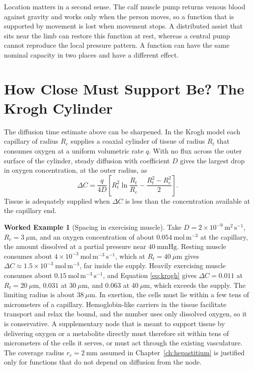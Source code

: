 \documentclass[11pt,openany]{book}
\theoremstyle{definition}
\newtheorem{example}{Worked Example}[chapter]
\theoremstyle{remark}
\begin{document}
Location matters in a second sense. The calf muscle pump returns venous blood against gravity and works only when the person moves, so a function that is supported by movement is lost when movement stops. A distributed assist that sits near the limb can restore this function at rest, whereas a central pump cannot reproduce the local pressure pattern. A function can have the same nominal capacity in two places and have a different effect.

\section{How Close Must Support Be? The Krogh Cylinder}

The diffusion time estimate above can be sharpened. In the Krogh model each capillary of radius $R_c$ supplies a coaxial cylinder of tissue of radius $R_t$ that consumes oxygen at a uniform volumetric rate $q$. With no flux across the outer surface of the cylinder, steady diffusion with coefficient $D$ gives the largest drop in oxygen concentration, at the outer radius, as
\begin{equation}
\Delta C=\frac{q}{4D}\left[R_t^{2}\ln\frac{R_t}{R_c}-\frac{R_t^{2}-R_c^{2}}{2}\right].
\label{eq:krogh}
\end{equation}
Tissue is adequately supplied when $\Delta C$ is less than the concentration available at the capillary end.

\begin{example}[Spacing in exercising muscle]
\label{ex:krogh}
Take $D=2\times10^{-9}\ \mathrm{m^{2}\,s^{-1}}$, $R_c=3\ \mu\mathrm{m}$, and an oxygen concentration of about $0.054\ \mathrm{mol\,m^{-3}}$ at the capillary, the amount dissolved at a partial pressure near $40\ \mathrm{mmHg}$. Resting muscle consumes about $4\times10^{-3}\ \mathrm{mol\,m^{-3}\,s^{-1}}$, which at $R_t=40\ \mu\mathrm{m}$ gives $\Delta C\approx1.5\times10^{-3}\ \mathrm{mol\,m^{-3}}$, far inside the supply. Heavily exercising muscle consumes about $0.15\ \mathrm{mol\,m^{-3}\,s^{-1}}$, and Equation \eqref{eq:krogh} gives $\Delta C=0.011$ at $R_t=20\ \mu\mathrm{m}$, $0.031$ at $30\ \mu\mathrm{m}$, and $0.063$ at $40\ \mu\mathrm{m}$, which exceeds the supply. The limiting radius is about $38\ \mu\mathrm{m}$. In exertion, the cells must lie within a few tens of micrometers of a capillary. Hemoglobin-like carriers in the tissue facilitate transport and relax the bound, and the number uses only dissolved oxygen, so it is conservative. A supplementary node that is meant to support tissue by delivering oxygen or a metabolite directly must therefore sit within tens of micrometers of the cells it serves, or must act through the existing vasculature. The coverage radius $r_c=2\ \mathrm{mm}$ assumed in Chapter~\ref{ch:hepastitium} is justified only for functions that do not depend on diffusion from the node.
\end{example}
\end{document}
